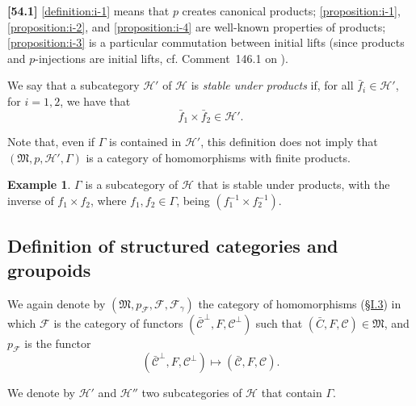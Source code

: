 \documentclass[a4paper,fleqn]{article}
\theoremstyle{plain}
\theoremstyle{definition}
\newenvironment{definition}[1]
  {\renewcommand\theinnerdefinition{#1}\innerdefinition}
  {\endinnerdefinition}
\newtheorem*{example}{Example}
\newenvironment{longcomm}[1]
  {\noindent\textbf{[#1]}\rmfamily}
  {}
\newcommand{\oldpage}[1]{{\marginpar{\footnotesize$\bigg\vert$\,\,\,\,\textit{p.~#1}}}}
\newcommand{\CC}{\mathcal{C}}
\newcommand{\HH}{\mathcal{H}}
\newcommand{\MM}{\mathfrak{M}}
\newcommand{\FF}{\mathcal{F}}
\begin{document}
\begin{longcomm}{54.1}
  \cref{definition:i-1} means that $p$ creates canonical products;
  \cref{proposition:i-1}, \cref{proposition:i-2}, and \cref{proposition:i-4} are well-known properties of products;
  \cref{proposition:i-3} is a particular commutation between initial lifts (since products and $p$-injections are initial lifts, cf. Comment~146.1 on \cite{coll66}).
\end{longcomm}

\begin{definition}{2}
\label{definition:ii-2}
  We say that a subcategory $\HH'$ of $\HH$ is \emph{stable under products} if, for all $\bar{f}_i\in\HH'$, for $i=1,2$, we have that
  \[
    \bar{f}_1\times\bar{f}_2
    \in\HH'.
  \]
\end{definition}

Note that, even if $\Gamma$ is contained in $\HH'$, this definition does not imply that $(\MM,p,\HH',\Gamma)$ is a category of homomorphisms with finite products.

\oldpage{383}
\begin{example}
  $\Gamma$ is a subcategory of $\HH$ that is stable under products, with the inverse of $f_1\times f_2$, where $f_1,f_2\in\Gamma$, being $(f_1^{-1}\times f_2^{-1})$.
\end{example}



\subsection{Definition of structured categories and groupoids}
\label{section:ii.2}

We again denote by $(\MM,p_\FF,\FF,\FF_\gamma)$ the category of homomorphisms (\hyperref[section:i.3]{§I.3}) in which $\FF$ is the category of functors $(\bar{\CC}^\perp,F,\CC^\perp)$ such that $(\bar{C},F,\CC)\in\MM$, and $p_\FF$ is the functor
\[
  (\bar{\CC}^\perp,F,\CC^\perp)
  \longmapsto (\bar{\CC},F,\CC).
\]

We denote by $\HH'$ and $\HH''$ two subcategories of $\HH$ that contain $\Gamma$.
\end{document}
